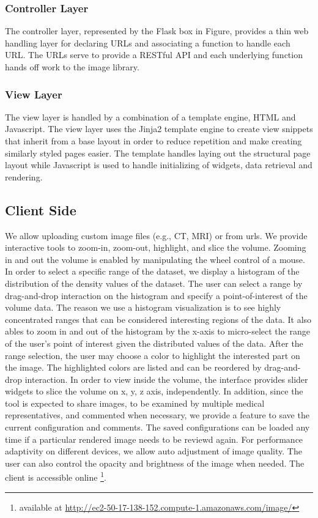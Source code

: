 \documentclass[annual]{acmsiggraph}
\begin{document}
\subsubsection{Controller Layer}
	The controller layer, represented by the Flask box in Figure, provides a thin web handling layer for declaring URLs and associating a function to handle each URL.  The URLs serve to provide a RESTful API and each underlying function hands off work to the image library.

\subsubsection{View Layer}
	The view layer is handled by a combination of a template engine, HTML and Javascript.  The view layer uses the Jinja2 template engine to create view snippets that inherit from a base layout in order to reduce repetition and make creating similarly styled pages easier.  The template handles laying out the structural page layout while Javascript is used to handle initializing of widgets, data retrieval and rendering.

\subsection{Client Side}
We allow uploading custom image files (e.g., CT, MRI) or from urls. We provide interactive tools to zoom-in, zoom-out, highlight, and slice the volume. Zooming in and out the volume is enabled by manipulating the wheel control of a mouse. In order to select a specific range of the dataset, we display a histogram of the distribution of the density values of the dataset. The user can select a range by drag-and-drop interaction on the histogram and specify a point-of-interest of the volume data. The reason we use a histogram visualization is to see highly concentrated ranges that can be considered interesting regions of the data. It also ables to zoom in and out of the histogram by the x-axis to micro-select the range of the user's point of interest given the distributed values of the data. After the range selection, the user may choose a color to highlight the interested part on the image. The highlighted colors are listed and can be reordered by drag-and-drop interaction. In order to view inside the volume, the interface provides slider widgets to slice the volume on x, y, z axis, independently. In addition, since the tool is expected to share images, to be examined by multiple medical representatives, and commented when necessary, we provide a feature to save the current configuration and comments. The saved configurations can be loaded any time if a particular rendered image needs to be reviewd again. For performance adaptivity on different devices, we allow auto adjustment of image quality. The user can also control the opacity and brightness of the image when needed. The client is accessible online \footnote{available at \url{http://ec2-50-17-138-152.compute-1.amazonaws.com/image/}}.
\end{document}
